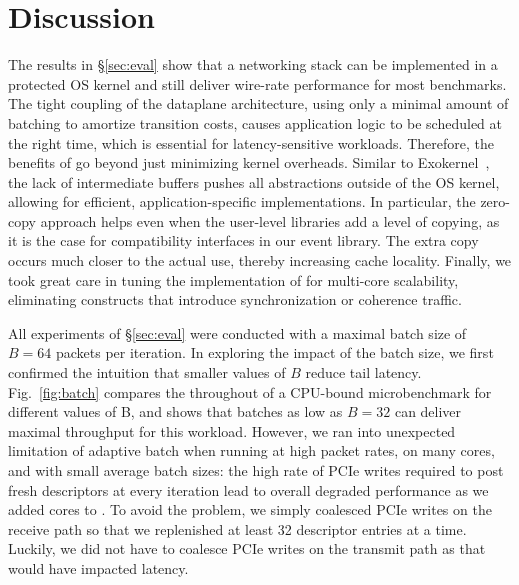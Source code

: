 
\section{Discussion}
\label{sec:disc}


 The results in \S\ref{sec:eval}
show that a networking stack can be implemented in a protected OS
kernel and still deliver wire-rate performance for most benchmarks.
The tight coupling of the dataplane architecture, using only a minimal
amount of batching to amortize transition costs, causes application
logic to be scheduled at the right time, which is essential for
latency-sensitive workloads.  Therefore, the benefits of \ix go beyond
just minimizing kernel overheads. Similar to
Exokernel~\cite{DBLP:conf/sosp/EnglerKO95}, the lack of intermediate
buffers pushes all abstractions outside of the OS kernel, allowing for
efficient, application-specific implementations.  In particular, the
zero-copy approach helps even when the user-level libraries add a
level of copying, as it is the case for compatibility interfaces in
our event library.  The extra copy occurs much closer to the actual
use, thereby increasing cache locality.  Finally, we took great care
in tuning the implementation of \ix for multi-core scalability,
eliminating constructs that introduce synchronization or coherence
traffic.



 All experiments of
\S\ref{sec:eval} were conducted with a maximal batch size of $B=64$
packets per iteration. In exploring the impact of the batch size, we
first confirmed the intuition that smaller values of $B$ reduce tail
latency.  Fig.~\ref{fig:batch} compares the throughout of a CPU-bound
microbenchmark for different values of B, and shows that batches as
low as $B=32$ can deliver maximal throughput for this workload.
However, we ran into unexpected limitation of adaptive batch when
running \ix at high packet rates, on many cores, and with small
average batch sizes: the high rate of PCIe writes required to post
fresh descriptors at every iteration lead to overall degraded
performance as we added cores to \ix.  To avoid the problem, we simply
coalesced PCIe writes on the receive path so that we replenished at
least 32 descriptor entries at a time.  Luckily, we did not have to
coalesce PCIe writes on the transmit path as that would have impacted latency.


